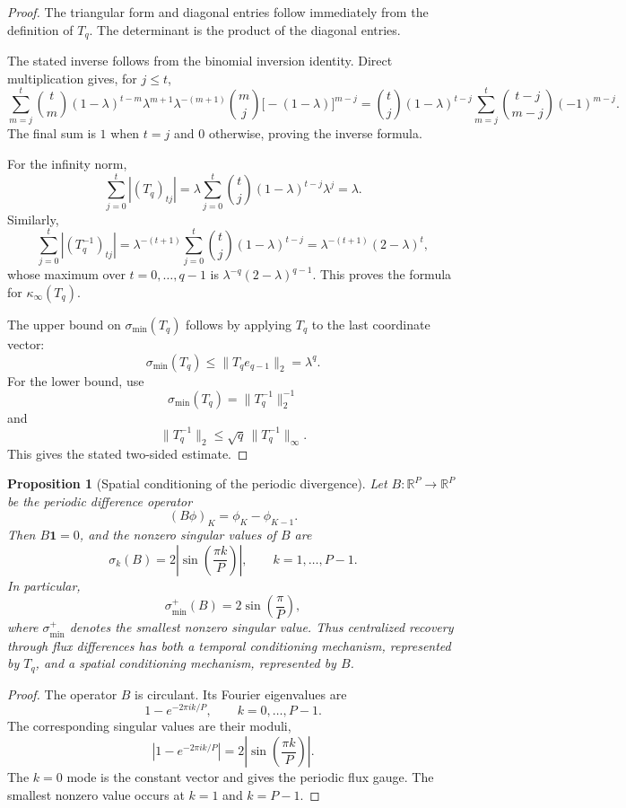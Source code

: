 \documentclass[pdflatex,sn-mathphys-num]{sn-jnl}%
\newtheorem{proposition}{Proposition}
\theoremstyle{thmstyleone}%
\theoremstyle{thmstyletwo}%
\theoremstyle{thmstylethree}%
\begin{document}
\begin{proof}
The triangular form and diagonal entries follow immediately from the
definition of \(T_q\).  The determinant is the product of the diagonal
entries.

The stated inverse follows from the binomial inversion identity.  Direct
multiplication gives, for \(j\le t\),
\[
  \sum_{m=j}^{t}
  \binom{t}{m}(1-\lambda)^{t-m}\lambda^{m+1}
  \lambda^{-(m+1)}
  \binom{m}{j}\bigl[-(1-\lambda)\bigr]^{m-j}
  =
  \binom{t}{j}(1-\lambda)^{t-j}
  \sum_{m=j}^{t}
  \binom{t-j}{m-j}(-1)^{m-j}.
\]
The final sum is \(1\) when \(t=j\) and \(0\) otherwise, proving the inverse
formula.

For the infinity norm,
\[
  \sum_{j=0}^{t}
  |(T_q)_{tj}|
  =
  \lambda
  \sum_{j=0}^{t}
  \binom{t}{j}(1-\lambda)^{t-j}\lambda^j
  =
  \lambda.
\]
Similarly,
\[
  \sum_{j=0}^{t}
  |(T_q^{-1})_{tj}|
  =
  \lambda^{-(t+1)}
  \sum_{j=0}^{t}
  \binom{t}{j}(1-\lambda)^{t-j}
  =
  \lambda^{-(t+1)}(2-\lambda)^t,
\]
whose maximum over \(t=0,\ldots,q-1\) is
\(\lambda^{-q}(2-\lambda)^{q-1}\).  This proves the formula for
\(\kappa_\infty(T_q)\).

The upper bound on \(\sigma_{\min}(T_q)\) follows by applying \(T_q\) to the
last coordinate vector:
\[
  \sigma_{\min}(T_q)\le \|T_q e_{q-1}\|_2=\lambda^q.
\]
For the lower bound, use
\[
  \sigma_{\min}(T_q)=\|T_q^{-1}\|_2^{-1}
\]
and
\[
  \|T_q^{-1}\|_2\le \sqrt q\,\|T_q^{-1}\|_\infty.
\]
This gives the stated two-sided estimate.
\end{proof}

\begin{proposition}[Spatial conditioning of the periodic divergence]
\label{prop:spatial-conditioning}
Let \(B:\mathbb R^P\to\mathbb R^P\) be the periodic difference operator
\[
  (B\phi)_K=\phi_K-\phi_{K-1}.
\]
Then \(B\mathbf 1=0\), and the nonzero singular values of \(B\) are
\[
  \sigma_k(B)
  =
  2\left|\sin\left(\frac{\pi k}{P}\right)\right|,
  \qquad
  k=1,\ldots,P-1.
\]
In particular,
\[
  \sigma_{\min}^+(B)
  =
  2\sin\left(\frac{\pi}{P}\right),
\]
where \(\sigma_{\min}^+\) denotes the smallest nonzero singular value.
Thus centralized recovery through flux differences has both a temporal
conditioning mechanism, represented by \(T_q\), and a spatial conditioning
mechanism, represented by \(B\).
\end{proposition}

\begin{proof}
The operator \(B\) is circulant.  Its Fourier eigenvalues are
\[
  1-e^{-2\pi i k/P},
  \qquad
  k=0,\ldots,P-1.
\]
The corresponding singular values are their moduli,
\[
  |1-e^{-2\pi i k/P}|
  =
  2\left|\sin\left(\frac{\pi k}{P}\right)\right|.
\]
The \(k=0\) mode is the constant vector and gives the periodic flux gauge.
The smallest nonzero value occurs at \(k=1\) and \(k=P-1\).
\end{proof}
\end{document}
